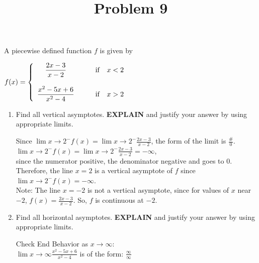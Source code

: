 \documentclass{ximera}
\title[Problem 9]{Problem 9}
\begin{document}
\begin{abstract} \end{abstract}
\maketitle


\begin{problem}
A  piecewise defined function $f$ is given by 
 
	$f(x) =   \left\{ \begin{array}{cl}
	\dfrac{2 x-3}{x-2}		 	&	\qquad \text{if }\hspace{0.1in}  x <  2	\\ \\
	\dfrac{x^2-5x +6}{x^2-4}	&	\qquad \text{if } \hspace{0.1in}   x>2 	
		
						\end{array} \right.  $\\[1em]

  \begin{enumerate}

    \item Find all vertical asymptotes.   \textbf{EXPLAIN} and justify your answer by using appropriate limits.\\[1em]
  
    \begin{explanation}
     Since $ \displaystyle \lim{x \to 2^-} f(x)= \displaystyle \lim{x \to 2^-}\frac{2x-3}{x-2}$, the form of the limit is $\frac{\#}{0}$.\\[1em]
     $ \displaystyle \lim{x \to 2^-} f(x)=  \displaystyle \lim{x \to 2^-}\frac{2x-3}{x-2}= -\infty$,\\[1em]
      since the numerator  positive, the denominator negative and goes to 0.\\
      Therefore, the line $x=2$ is a vertical asymptote of $f$ since $\displaystyle \lim{x\to 2^-} f(x) = -\infty$.\\

      Note: The line $x=-2$ is not a vertical asymptote, since for values of $x$ near $-2$, $f(x)=\frac{2 x-3}{x-2}$. So, $f$ is continuous at $-2$.
    \end{explanation}

    \item Find all horizontal asymptotes. \textbf{EXPLAIN} and justify your answer by using appropriate limits.\\[1em]
      \begin{explanation}
        Check End Behavior as $x \to \infty$:\\[1em]
        $\displaystyle \lim{x \to \infty}\frac{x^2-5x +6}{x^2-4}$ is of the form: $\frac{\infty}{\infty}$
        

\end{explanation}
\end{enumerate}
\end{problem}
\end{document}
